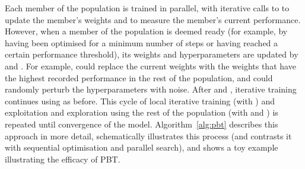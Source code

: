 Each member of the population is trained in parallel, with iterative calls to \pbtstep to update the member's weights and \pbteval to measure the member's current performance. However, when a member of the population is deemed ready (for example, by having been optimised for a minimum number of steps or having reached a certain performance threshold), its weights and hyperparameters are updated by \pbtexploit and \pbtexplore. For example, \pbtexploit could replace the current weights with the weights that have the highest recorded performance in the rest of the population, and \pbtexplore could randomly perturb the hyperparameters with noise. After \pbtexploit and \pbtexplore, iterative training continues using \pbtstep as before. This cycle of local iterative training (with \pbtstep) and exploitation and exploration using the rest of the population (with \pbtexploit and \pbtexplore) is repeated until convergence of the model. Algorithm~\ref{alg:pbt} describes this approach in more detail,  schematically illustrates this process (and contrasts it with sequential optimisation and parallel search), and  shows a toy example illustrating the efficacy of PBT.


